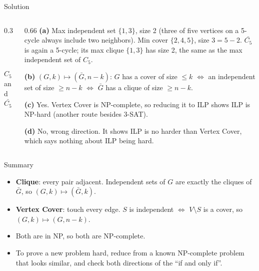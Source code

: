 \documentclass[10pt,aspectratio=169]{beamer}
\newcommand{\pentagon}[5]{%
  \node[#1] (v1) at (90:1.6)  {1};
  \node[#2] (v2) at (18:1.6)  {2};
  \node[#3] (v3) at (-54:1.6) {3};
  \node[#4] (v4) at (-126:1.6) {4};
  \node[#5] (v5) at (162:1.6) {5};
}
\begin{document}
\begin{frame}{Solution}
  \begin{columns}[c]
    \begin{column}{0.3\textwidth}
      \begin{center}
      \\[2pt]
      \\[2pt]
      \small $C_5$ and $\bar{C_5}$
      \end{center}
    \end{column}
    \begin{column}{0.66\textwidth}
      \small
      \textbf{(a)} Max independent set $\{1, 3\}$, size 2 (three of five
      vertices on a 5-cycle always include two neighbors). Min cover
      $\{2, 4, 5\}$, size $3 = 5 - 2$. $\bar{C_5}$ is again a 5-cycle; its
      max clique $\{1, 3\}$ has size 2, the same as the max independent set
      of $C_5$.

      \medskip
      \textbf{(b)} $(G, k) \mapsto (\bar{G}, n - k)$: $G$ has a cover of size
      $\le k$ $\iff$ an independent set of size $\ge n - k$ $\iff$
      $\bar{G}$ has a clique of size $\ge n - k$.

      \medskip
      \textbf{(c)} Yes. Vertex Cover is NP-complete, so reducing it to ILP
      shows ILP is NP-hard (another route besides 3-SAT).

      \medskip
      \textbf{(d)} No, wrong direction. It shows ILP is no harder than Vertex
      Cover, which says nothing about ILP being hard.
    \end{column}
  \end{columns}
\end{frame}

\begin{frame}{Summary}
  \begin{itemize}
    \item \textbf{Clique}: every pair adjacent. Independent sets of $G$ are
          exactly the cliques of $\bar{G}$, so $(G, k) \mapsto (\bar{G}, k)$.
    \item \textbf{Vertex Cover}: touch every edge. $S$ is independent
          $\iff$ $V \setminus S$ is a cover, so $(G, k) \mapsto (G, n - k)$.
    \item Both are in NP, so both are NP-complete.
    \item To prove a new problem hard, reduce \alert{from} a known
          NP-complete problem that looks similar, and check both directions
          of the ``if and only if''.
  \end{itemize}
\end{frame}
\end{document}
